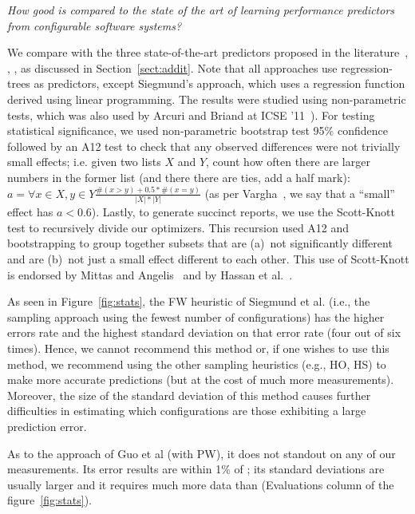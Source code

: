 
 \begin{center}
{\em How good is \what compared to the state of the art of learning performance predictors from configurable software systems?}
\end{center}

We compare \what with the three state-of-the-art predictors proposed in the literature~\cite{siegmund2012predicting}, \cite{guo2013variability}, \cite{sarkar2015cost}, as discussed in Section~\ref{sect:addit}. Note that all approaches use regression-trees as predictors, except Siegmund's approach, which uses a regression function derived using linear programming.
The results were studied using non-parametric tests, which was also used by Arcuri and Briand at ICSE
'11~\cite{mittas13}). For testing statistical significance,
we used non-parametric bootstrap test 95\% confidence~\cite{efron93} followed by
an A12 test to check that any observed differences were not trivially small effects;
i.e. given two lists $X$ and $Y$, count how often there are larger
numbers in the former list (and there there are ties, add a half mark):
$a=\forall x\in X, y\in Y\frac{\#(x>y) + 0.5*\#(x=y)}{|X|*|Y|}$
(as per Vargha~\cite{Vargha00}, we say that a ``small'' effect has $a <0.6$). 
Lastly, to generate succinct reports, we use the Scott-Knott test to recursively
divide our optimizers. This recursion used A12 and bootstrapping  
to group together subsets that are (a)~not significantly different and are (b)~not
just a small effect different to each other. This use of Scott-Knott is endorsed
by Mittas and Angelis~\cite{mittas13}
and by Hassan et al.~\cite{7194626}.

As seen in Figure~\ref{fig:stats}, the FW heuristic of Siegmund et al. (i.e., the sampling approach using the fewest number of configurations)  has the higher errors rate and the highest standard deviation on that error rate (four out of six times). Hence, we cannot recommend this method or, if one wishes to use this method, we recommend using the other sampling heuristics (e.g., HO, HS) to make more accurate predictions (but at the cost of much more measurements). Moreover, the size of the standard deviation of this method causes further difficulties in estimating which configurations are those exhibiting a large prediction error. 


As to the approach of Guo et al (with PW), it does not standout on any of our measurements. Its error results are within 1\% of \what; its standard deviations are usually larger and it requires much more data than \what (Evaluations column of the figure~\ref{fig:stats}). 


